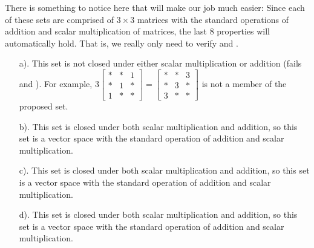 %
There is something to notice here that will make our job much easier:  Since each of these sets are comprised of $3\times 3$ matrices with the standard operations of addition and scalar multiplication of matrices, the last 8 properties will automatically hold.  That is, we really only need to verify  and .
\begin{itemize}
%
\item[a). ]  
This set is not closed under either scalar multiplication or addition (fails  and ).  For example, 
$3\begin{bmatrix} *&*&1\\ *&1&*\\ 1&*&*\end{bmatrix} 
= \begin{bmatrix} *&*&3\\ *&3&*\\ 3&*&*\end{bmatrix}$ 
is not a member of the proposed set.
%
\item[b). ]  
This set is closed under both scalar multiplication and addition, so this set is a vector space with the standard operation of addition and scalar multiplication.
%
\item[c). ]  
This set is closed under both scalar multiplication and addition, so this set is a vector space with the standard operation of addition and scalar multiplication.
%
\item[d). ]  
This set is closed under both scalar multiplication and addition, so this set is a vector space with the standard operation of addition and scalar multiplication.
%
\end{itemize}